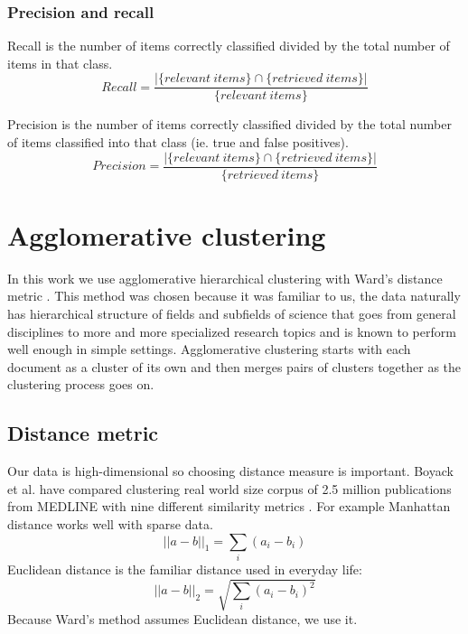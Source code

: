 \subsubsection{Precision and recall}
Recall is the number of items correctly classified divided by the 
total number of items in that class.
\begin{equation}
 Recall = \frac{|\{relevant\ items\} \cap \{retrieved\ items\}|} 
{\{relevant\ items\}}
\end{equation}

Precision is the number of items correctly classified divided by 
the total number of items classified into that class (ie. true and 
false positives).
\begin{equation}
 Precision = \frac{|\{relevant\ items\} \cap \{retrieved\ 
items\}|} 
{\{retrieved\ items\}}
\end{equation}


\section{Agglomerative clustering}
\label{sec:agglomerativeclustering}
In this work we use agglomerative hierarchical clustering with 
Ward's distance metric \cite{ward_jr_hierarchical_1963}. This 
method was chosen because it was familiar to us, the data naturally 
has hierarchical structure of fields and subfields of science that 
goes from general disciplines to more and more specialized research
topics and is known to perform well enough in simple settings. 
Agglomerative clustering starts with each document 
as a cluster of its own and then merges pairs of clusters together 
as the clustering process goes on.


\subsection{Distance metric}
Our data is high-dimensional so choosing distance measure is 
important. 
Boyack et al. have compared clustering real world size corpus of 
2.5 million publications from MEDLINE with nine different 
similarity metrics \cite{boyack_clustering_2011}.
For example Manhattan distance works well with sparse data.
\begin{equation}
 ||a-b||_1 = \sum_i{(a_i-b_i)}
\end{equation}
Euclidean distance is the familiar distance used in everyday life:
\begin{equation}
 ||a-b||_2 = \sqrt{\sum_i{(a_i-b_i)^2}}
\end{equation}
Because Ward's method assumes Euclidean distance, we use it.


